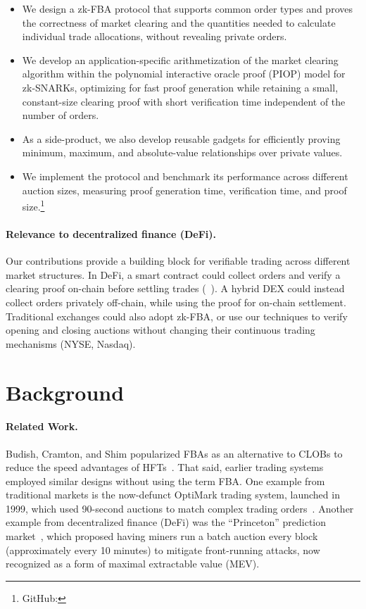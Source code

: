\begin{itemize}
\item We design a zk-FBA protocol that supports common order types and proves the correctness of market clearing and the quantities needed to calculate individual trade allocations, without revealing private orders.
\item We develop an application-specific arithmetization of the market clearing algorithm within the polynomial interactive oracle proof (PIOP) model for zk-SNARKs, optimizing for fast proof generation while retaining a small, constant-size clearing proof with short verification time independent of the number of orders.
\item As a side-product, we also develop reusable gadgets for efficiently proving minimum, maximum, and absolute-value relationships over private values. 
\item We implement the protocol and benchmark its performance across different auction sizes, measuring proof generation time, verification time, and proof size.\footnote{GitHub: }
\end{itemize}

\paragraph{Relevance to decentralized finance (DeFi).} Our contributions provide a building block for verifiable trading across different market structures. In DeFi, a smart contract could collect orders and verify a clearing proof on-chain before settling trades (\cf~\cite{GY21,MoCl23}). A hybrid DEX could instead collect orders privately off-chain, while using the proof for on-chain settlement. Traditional exchanges could also adopt zk-FBA, or use our techniques to verify opening and closing auctions without changing their continuous trading mechanisms (\eg NYSE, Nasdaq).

\section{Background}

\paragraph{Related Work.} Budish, Cramton, and Shim popularized FBAs as an alternative to CLOBs to reduce the speed advantages of HFTs~\cite{BCS15}. That said, earlier trading systems employed similar designs without using the term FBA. One example from traditional markets is the now-defunct OptiMark trading system, launched in 1999, which used 90-second auctions to match complex trading orders~\cite{CW01}. Another example from decentralized finance (DeFi) was the ``Princeton'' prediction market~\cite{BCFKMN14}, which proposed having miners run a batch auction every block (approximately every 10 minutes) to mitigate front-running attacks, now recognized as a form of maximal extractable value (MEV).

